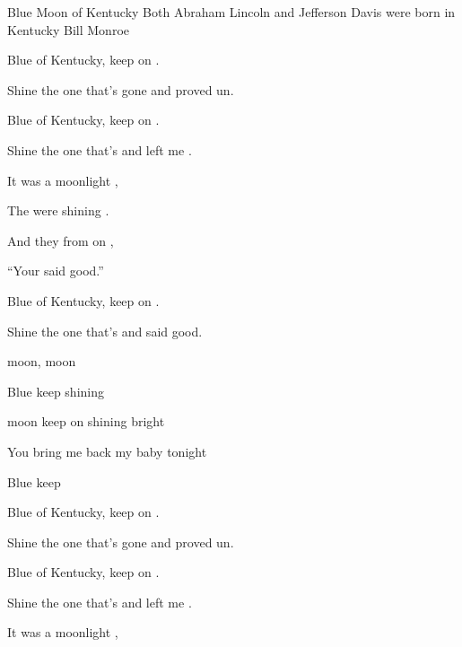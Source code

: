 \begin{SBSong}{Blue Moon of Kentucky}
  {Both Abraham Lincoln and Jefferson Davis were born in Kentucky}
  {Bill Monroe}
  \begin{SBVerse}
    Blue  of Kentucky, keep on . 
    
    Shine  the one that's gone and proved un. 
    
    Blue  of Kentucky, keep on . 
    
    Shine  the one that's  and left me . 
  \end{SBVerse}
  \begin{SBChorus}
    It was  a moonlight , 
    
    The  were shining . 
    
    And they  from on , 
    
    ``Your   said good.'' 
    
    Blue  of Kentucky, keep on . 
    
    Shine  the one that's  and said good.
  \end{SBChorus}
  \begin{SBVerse}
     moon,  moon

    Blue  keep shining 

     moon keep on shining bright
    
    You  bring me back my baby tonight
    
    Blue  keep  
  \end{SBVerse}
  \begin{SBVerse}
    Blue  of Kentucky, keep on . 
    
    Shine  the one that's gone and proved un. 
    
    Blue  of Kentucky, keep on . 
    
    Shine  the one that's  and left me . 
  \end{SBVerse}
  \begin{SBChorus}
    It was  a moonlight , 
    

\end{SBChorus}
\end{SBSong}
